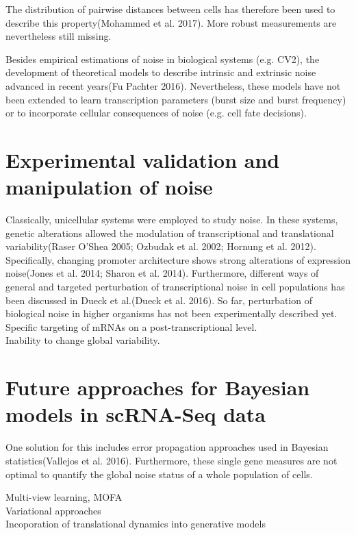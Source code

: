  The distribution of pairwise distances between cells has therefore been used to describe this property(Mohammed et al. 2017). More robust measurements are nevertheless still missing.
 
 Besides empirical estimations of noise in biological systems (e.g. CV2), the development of theoretical models to describe intrinsic and extrinsic noise advanced in recent years(Fu Pachter 2016). Nevertheless, these models have not been extended to learn transcription parameters (burst size and burst frequency) or to incorporate cellular consequences of noise (e.g. cell fate decisions).

\section{Experimental validation and manipulation of noise}

Classically, unicellular systems were employed to study noise. In these systems, genetic alterations allowed the modulation of transcriptional and translational variability(Raser O’Shea 2005; Ozbudak et al. 2002; Hornung et al. 2012). Specifically, changing promoter architecture shows strong alterations of expression noise(Jones et al. 2014; Sharon et al. 2014). Furthermore, different ways of general and targeted perturbation of transcriptional noise in cell populations has been discussed in Dueck et al.(Dueck et al. 2016). So far, perturbation of biological noise in higher organisms has not been experimentally described yet.\\


Specific targeting of mRNAs on a post-transcriptional level.\\

Inability to change global variability. \\


\section{Future approaches for Bayesian models in scRNA-Seq data}

One solution for this includes error propagation approaches used in Bayesian statistics(Vallejos et al. 2016). Furthermore, these single gene measures are not optimal to quantify the global noise status of a whole population of cells.

Multi-view learning, MOFA\\
Variational approaches\\
Incoporation of translational dynamics into generative models

